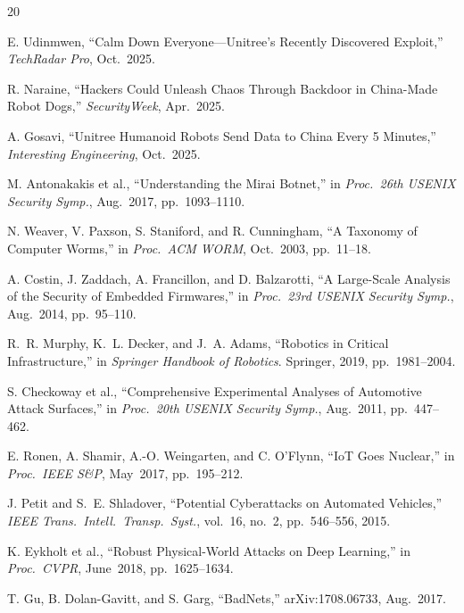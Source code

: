 \documentclass[journal]{IEEEtran}
\begin{document}

\begin{thebibliography}{20}

E. Udinmwen, ``Calm Down Everyone---Unitree's Recently Discovered Exploit,'' \textit{TechRadar Pro}, Oct.~2025.

R. Naraine, ``Hackers Could Unleash Chaos Through Backdoor in China-Made Robot Dogs,'' \textit{SecurityWeek}, Apr.~2025.

A. Gosavi, ``Unitree Humanoid Robots Send Data to China Every 5 Minutes,'' \textit{Interesting Engineering}, Oct.~2025.

M. Antonakakis et al., ``Understanding the Mirai Botnet,'' in \textit{Proc.\ 26th USENIX Security Symp.}, Aug.~2017, pp.~1093--1110.

N. Weaver, V. Paxson, S. Staniford, and R. Cunningham, ``A Taxonomy of Computer Worms,'' in \textit{Proc.\ ACM WORM}, Oct.~2003, pp.~11--18.

A. Costin, J. Zaddach, A. Francillon, and D. Balzarotti, ``A Large-Scale Analysis of the Security of Embedded Firmwares,'' in \textit{Proc.\ 23rd USENIX Security Symp.}, Aug.~2014, pp.~95--110.

R.~R. Murphy, K.~L. Decker, and J.~A. Adams, ``Robotics in Critical Infrastructure,'' in \textit{Springer Handbook of Robotics}. Springer, 2019, pp.~1981--2004.

S. Checkoway et al., ``Comprehensive Experimental Analyses of Automotive Attack Surfaces,'' in \textit{Proc.\ 20th USENIX Security Symp.}, Aug.~2011, pp.~447--462.

E. Ronen, A. Shamir, A.-O. Weingarten, and C. O'Flynn, ``IoT Goes Nuclear,'' in \textit{Proc.\ IEEE S\&P}, May~2017, pp.~195--212.

J. Petit and S.~E. Shladover, ``Potential Cyberattacks on Automated Vehicles,'' \textit{IEEE Trans.\ Intell.\ Transp.\ Syst.}, vol.~16, no.~2, pp.~546--556, 2015.

K. Eykholt et al., ``Robust Physical-World Attacks on Deep Learning,'' in \textit{Proc.\ CVPR}, June~2018, pp.~1625--1634.

T. Gu, B. Dolan-Gavitt, and S. Garg, ``BadNets,'' arXiv:1708.06733, Aug.~2017.


\end{thebibliography}
\end{document}
